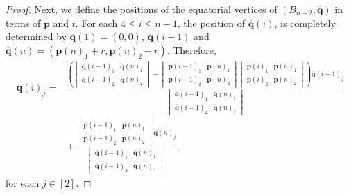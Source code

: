 \documentclass[11pt]{amsart}
\theoremstyle{definition}
\theoremstyle{remark}
\begin{document}
\begin{proof}
    Next, we define the positions of the equatorial vertices of $(B_{n-2},\overline{\mathbf{q}})$ in terms of $\overline{\mathbf{p}}$ and $t$.
    For each $4\leq i\leq n-1$, the position of $\overline{\mathbf{q}}(i)$, is completely determined by $\overline{\mathbf{q}}(1)=(0,0)$, $\overline{\mathbf{q}}(i-1)$ and $\overline{\mathbf{q}}(n)=(\overline{\mathbf{p}}(n)_1+r,\overline{\mathbf{p}}(n)_2-r)$.
    Therefore,
    \begin{equation}\label{eq:bip3}
    \begin{split}
        \overline{\mathbf{q}}(i)_j=&\frac{\left(\begin{vmatrix} \overline{\mathbf{q}}(i-1)_1 & \overline{\mathbf{q}}(n)_1 \\ \overline{\mathbf{q}}(i-1)_2 & \overline{\mathbf{q}}(n)_2 \end{vmatrix} - \begin{vmatrix} \overline{\mathbf{p}}(i-1)_1 & \overline{\mathbf{p}}(n)_1 \\ \overline{\mathbf{p}}(i-1)_2 & \overline{\mathbf{p}}(n)_2 \end{vmatrix} \begin{vmatrix} \overline{\mathbf{p}}(i)_1 & \overline{\mathbf{p}}(n)_1 \\ \overline{\mathbf{p}}(i)_2 & \overline{\mathbf{p}}(n)_2 \end{vmatrix} \right)\overline{\mathbf{q}}(i-1)_j}{\begin{vmatrix} \overline{\mathbf{q}}(i-1)_1 & \overline{\mathbf{q}}(n)_1 \\ \overline{\mathbf{q}}(i-1)_2 & \overline{\mathbf{q}}(n)_2 \end{vmatrix}} \\
        &+ \frac{\begin{vmatrix} \overline{\mathbf{p}}(i-1)_1 & \overline{\mathbf{p}}(n)_1 \\ \overline{\mathbf{p}}(i-1)_2 & \overline{\mathbf{p}}(n)_2 \end{vmatrix}\overline{\mathbf{q}}(n)_j}{\begin{vmatrix} \overline{\mathbf{q}}(i-1)_1 & \overline{\mathbf{q}}(n)_1 \\ \overline{\mathbf{q}}(i-1)_2 & \overline{\mathbf{q}}(n)_2 \end{vmatrix}},
    \end{split}
    \end{equation}
    for each $j\in[2]$.


\end{proof}
\end{document}
